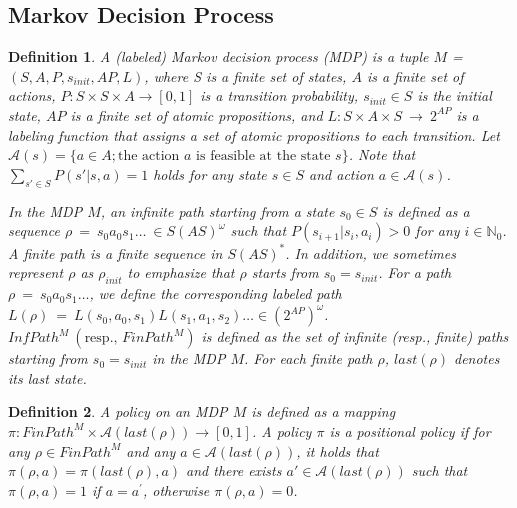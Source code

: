 \documentclass[letterpaper, 10 pt, conference]{ieeeconf}  %
\newtheorem{definition}{Definition}
\begin{document}
\subsection{Markov Decision Process}

\begin{definition}
A (labeled) Markov decision process (MDP) is a tuple $M$ = $(S, A, P, s_{init}, AP, L)$, where S is a finite set of states, $A$ is a finite set of actions, $P:S \times S \times A \rightarrow [0,1]$ is a transition probability, $s_{init} \in S$ is the initial state, $AP$ is a finite set of atomic propositions, and $L : S \times A \times S\ \rightarrow\ 2^{AP}$ is a labeling function that assigns a set of atomic propositions to each transition. Let $\mathcal{A}(s) = \{ a \in A ; \text{the action $a$ is feasible at the state $s$} \}$. Note that $\sum_{s' \in S} P(s'|s,a) = 1$ holds for any state $s \in S$ and action $a \in \mathcal{A}(s)$.

In the MDP $M$, an infinite path starting from a state $s_0 \in S$ is defined as a sequence $\rho\ =\ s_0a_0s_1 \ldots\ \in S (A S)^{\omega}$ such that $P(s_{i+1}|s_i, a_i) > 0$ for any $ i \in \mathbb{N}_0$. A finite path is a finite sequence in $S (A S)^{\ast}$. In addition, we sometimes represent $\rho$ as $\rho_{init}$ to emphasize that $\rho$ starts from $s_0 = s_{init}$.
For a path $\rho\ =\ s_0a_0s_1 \ldots$, we define the corresponding labeled path $L(\rho)\ =\ L(s_0,a_0,s_1)L(s_1,a_1,s_2) \ldots \in (2^{AP})^{\omega}$. $InfPath^{M}\ ( \text{resp., }FinPath^{M})$ is defined as the set of infinite (resp., finite) paths starting from $s_0=s_{init}$ in the MDP $M$. For each finite path $\rho$, $last(\rho)$ denotes its last state.
\end{definition}

\begin{definition}
  A policy on an MDP $M$ is defined as a mapping $\pi:FinPath^{M} \times \mathcal{A}(last(\rho)) \rightarrow [0,1]$. A policy $\pi$ is a {\it positional} policy if for any $ \rho \in FinPath^{M}$ and any $ a \in \mathcal{A}(last(\rho))$, it holds that $\pi(\rho, a)=\pi(last(\rho),a)$ and there exists $ a' \in \mathcal{A}(last(\rho))$ such that $\pi(\rho, a) = 1$ if $a=a^{\prime}$, otherwise $\pi(\rho, a) = 0$.

\end{definition}
\end{document}
